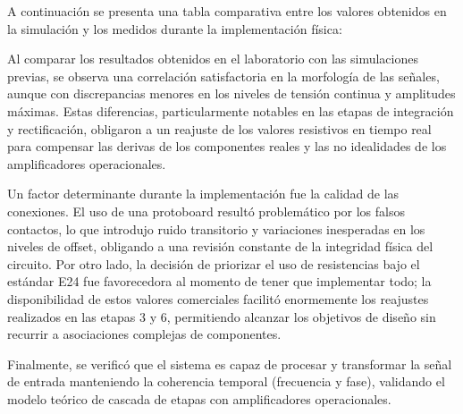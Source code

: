 A continuación se presenta una tabla comparativa entre los valores obtenidos en la simulación y los medidos durante la
implementación física:

\begin{table}[!ht]
\centering
\caption{Comparativa de niveles de tensión entre simulación e implementación.}
\label{tab:comparativa}
\end{table}

Al comparar los resultados obtenidos en el laboratorio con las simulaciones previas, se observa una correlación
satisfactoria en la morfología de las señales, aunque con discrepancias menores en los niveles de tensión continua y
amplitudes máximas.
 Estas diferencias, particularmente notables en las etapas de integración y rectificación, obligaron a un
reajuste de los valores resistivos en tiempo real para compensar las derivas de los componentes reales y las no
idealidades de los amplificadores operacionales.

Un factor determinante durante la implementación fue la calidad de las conexiones. El uso de una protoboard resultó
problemático por los falsos contactos, lo que introdujo ruido transitorio y variaciones inesperadas en los niveles de
offset, obligando a una revisión constante de la integridad física del circuito. Por otro lado, la decisión de priorizar
el uso de resistencias bajo el estándar E24 fue favorecedora al momento de tener que implementar todo; la disponibilidad
de estos valores comerciales facilitó enormemente los reajustes realizados en las etapas 3 y 6, permitiendo alcanzar los
objetivos de diseño sin recurrir a asociaciones complejas de componentes.

Finalmente, se verificó que el sistema es capaz de procesar y transformar la señal de entrada manteniendo la coherencia
temporal (frecuencia y fase), validando el modelo teórico de cascada de etapas con amplificadores operacionales.

